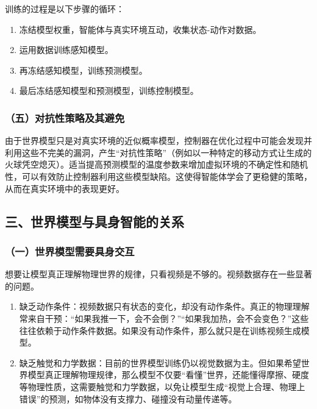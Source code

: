 训练的过程是以下步骤的循环：

\begin{enumerate}
\def\labelenumi{\arabic{enumi}.}
\item
  冻结模型权重，智能体与真实环境互动，收集状态-动作对数据。
\item
  运用数据训练感知模型。
\item
  再冻结感知模型，训练预测模型。
\item
  最后冻结感知模型和预测模型，训练控制模型。
\end{enumerate}

\hypertarget{ux4e94ux5bf9ux6297ux6027ux7b56ux7565ux53caux5176ux907fux514d}{%
\subsubsection{（五）对抗性策略及其避免}\label{ux4e94ux5bf9ux6297ux6027ux7b56ux7565ux53caux5176ux907fux514d}}

由于世界模型只是对真实环境的近似概率模型，控制器在优化过程中可能会发现并利用这些不完美的漏洞，产生``对抗性策略''（例如以一种特定的移动方式让生成的火球凭空熄灭）。适当提高预测模型的温度参数来增加虚拟环境的不确定性和随机性，可以有效防止控制器利用这些模型缺陷。这使得智能体学会了更稳健的策略，从而在真实环境中的表现更好。

\hypertarget{ux4e09ux4e16ux754cux6a21ux578bux4e0eux5177ux8eabux667aux80fdux7684ux5173ux7cfb}{%
\subsection{三、世界模型与具身智能的关系}\label{ux4e09ux4e16ux754cux6a21ux578bux4e0eux5177ux8eabux667aux80fdux7684ux5173ux7cfb}}

\hypertarget{ux4e00ux4e16ux754cux6a21ux578bux9700ux8981ux5177ux8eabux4ea4ux4e92}{%
\subsubsection{（一）世界模型需要具身交互}\label{ux4e00ux4e16ux754cux6a21ux578bux9700ux8981ux5177ux8eabux4ea4ux4e92}}

想要让模型真正理解物理世界的规律，只看视频是不够的。视频数据存在一些显著的问题。

\begin{enumerate}
\def\labelenumi{\arabic{enumi}.}
\item
  缺乏动作条件：视频数据只有状态的变化，却没有动作条件。真正的物理理解常来自干预：``如果我推一下，会不会倒？''``如果我加热，会不会变色？''这些往往依赖于动作条件数据。如果没有动作条件，那么就只是在训练视频生成模型。
\item
  缺乏触觉和力学数据：目前的世界模型训练仍以视觉数据为主。但如果希望世界模型真正理解物理规律，那么模型不仅要``看懂''世界，还能懂得摩擦、硬度等物理性质，这需要触觉和力学数据，以免让模型生成``视觉上合理、物理上错误''的预测，如物体没有支撑力、碰撞没有动量传递等。
\end{enumerate}

